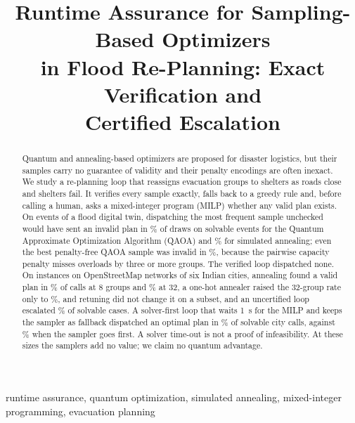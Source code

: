 \documentclass[conference]{IEEEtran}
\begin{document}
\title{Runtime Assurance for Sampling-Based Optimizers\\
in Flood Re-Planning: Exact Verification and\\
Certified Escalation}

\author{
}

\maketitle

\begin{abstract}
Quantum and annealing-based optimizers are proposed for disaster logistics, but their samples carry no guarantee of validity and their penalty encodings are often inexact. We study a re-planning loop that reassigns evacuation groups to shelters as roads close and shelters fail. It verifies every sample exactly, falls back to a greedy rule and, before calling a human, asks a mixed-integer program (MILP) whether any valid plan exists. On \TwinEvents{} events of a flood digital twin, dispatching the most frequent sample unchecked would have sent an invalid plan in \TwinRawFeasQ\% of draws on solvable events for the Quantum Approximate Optimization Algorithm (QAOA) and \TwinRawFeasSA\% for simulated annealing; even the best penalty-free QAOA sample was invalid in \BasePfQSol\%, because the pairwise capacity penalty misses overloads by three or more groups. The verified loop dispatched none. On \CityN{} instances on OpenStreetMap networks of six Indian cities, annealing found a valid plan in \CitySAFoundEight\% of calls at 8 groups and \CitySAFoundThirtyTwo\% at 32, a one-hot annealer raised the 32-group rate only to \OhValidThirtyTwo\%, and retuning did not change it on a subset, and an uncertified loop escalated \CityFalseEsc\% of solvable cases. A solver-first loop that waits 1~s for the MILP and keeps the sampler as fallback dispatched an optimal plan in \DfOptOne\% of solvable city calls, against \LoopOpt\% when the sampler goes first. A solver time-out is not a proof of infeasibility. At these sizes the samplers add no value; we claim no quantum advantage.
\end{abstract}

\begin{IEEEkeywords}
runtime assurance, quantum optimization, simulated annealing, mixed-integer programming, evacuation planning
\end{IEEEkeywords}
\end{document}
